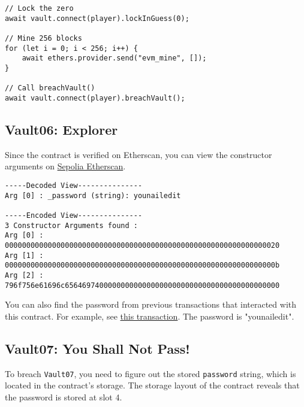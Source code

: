 \documentclass[12pt]{article}
\begin{document}
\noindent
\begin{minipage}{\textwidth}
\begin{verbatim}
// Lock the zero
await vault.connect(player).lockInGuess(0);

// Mine 256 blocks
for (let i = 0; i < 256; i++) {
    await ethers.provider.send("evm_mine", []);
}

// Call breachVault()
await vault.connect(player).breachVault();
\end{verbatim}
\end{minipage}

\subsection*{Vault06: Explorer}
Since the contract is verified on Etherscan, you can view the constructor arguments on \href{https://sepolia.etherscan.io/address/0xA3a763bF62550511A0E485d6EB16c98937609A32\#code}{Sepolia Etherscan}.

\begin{verbatim}
-----Decoded View---------------
Arg [0] : _password (string): younailedit

-----Encoded View---------------
3 Constructor Arguments found :
Arg [0] : 0000000000000000000000000000000000000000000000000000000000000020
Arg [1] : 000000000000000000000000000000000000000000000000000000000000000b
Arg [2] : 796f756e61696c65646974000000000000000000000000000000000000000000
\end{verbatim}

You can also find the password from previous transactions that interacted with this contract. For example, see \href{https://sepolia.etherscan.io/inputdatadecoder?tx=0xc1f544372d0e732537a72f5e6fba05ad2ef2346695519416bedd8f37d2f17a57}{this transaction}. The password is "younailedit".

\subsection*{Vault07: You Shall Not Pass!}

To breach \texttt{Vault07}, you need to figure out the stored \texttt{password} string, which is located in the contract's storage. The storage layout of the contract reveals that the password is stored at slot 4.
\end{document}
